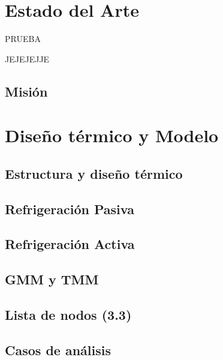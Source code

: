 
\section{Estado del Arte}

PRUEBA

JEJEJEJJE

\subsection{Misión}

\section{Diseño térmico y Modelo}

\subsection{Estructura y diseño térmico}


\subsection{Refrigeración Pasiva}

\subsection{Refrigeración Activa}

\subsection{GMM y TMM}

\subsection{Lista de nodos (3.3)}

\subsection{Casos de análisis}